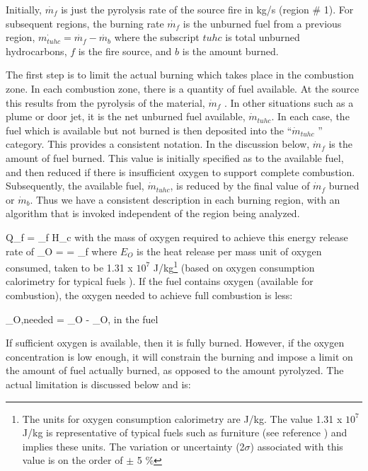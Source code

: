 Initially, $\dot{m_f}$ is just the pyrolysis rate of the source fire in kg/s (region \# 1). For subsequent regions, the burning rate $\dot{m_f}$ is the unburned fuel from a previous region, $\dot{m_{tuhc}} = \dot{m_f} - \dot{m_b}$ where the subscript $tuhc$ is total unburned hydrocarbons, $f$ is the fire source, and $b$ is the amount burned.

The first step is to limit the actual burning which takes place in the combustion zone.  In each combustion zone, there is a quantity of fuel available.  At the source this results from the pyrolysis of the material, $\dot{m}_f$ .  In other situations such as a plume or door jet, it is the net unburned fuel available, $\dot{m}_{tuhc}$.  In each case, the fuel which is available but not burned is then deposited into the ``$\dot{m}_{tuhc}$ '' category.  This provides a consistent notation.  In the discussion below,
$\dot{m}_f$  is the amount of fuel burned.  This value is initially specified as to the available fuel, and then reduced if there is insufficient oxygen to support complete combustion.  Subsequently, the available fuel, $\dot{m}_{tuhc}$, is reduced by the final value of $\dot{m}_f$ burned or $\dot{m}_b$.  Thus we have a consistent description in each burning region, with an algorithm that is invoked independent of the region being analyzed.

\be Q_f = _f H_c \ee
with the mass of oxygen required to achieve this energy release rate of
\be {}_O =  = _f  \ee
where $E_O$ is the heat release per mass unit of oxygen consumed, taken to be 1.31 x $10^7$ J/kg\footnote{The units for oxygen consumption calorimetry are J/kg. The value 1.31 x $10^7$ J/kg is representative of typical fuels such as furniture (see reference \cite{Morehart:1991}) and implies these units. The variation or uncertainty (2$\sigma$) associated with this value is on the order of $\pm$ 5 \%} (based on oxygen consumption calorimetry for typical fuels \cite{Morehart:1991, Thornton:1917, Huggett:1980}). If the fuel contains oxygen (available for combustion), the oxygen needed to achieve full combustion is less:

\be {}_{O,needed} = _O - _{O, in the fuel} \ee

If sufficient oxygen is available, then it is fully burned.  However, if the oxygen concentration is low enough, it will constrain the burning and impose a limit on the amount of fuel actually burned, as opposed to the amount pyrolyzed.  The actual limitation is discussed below and is:

